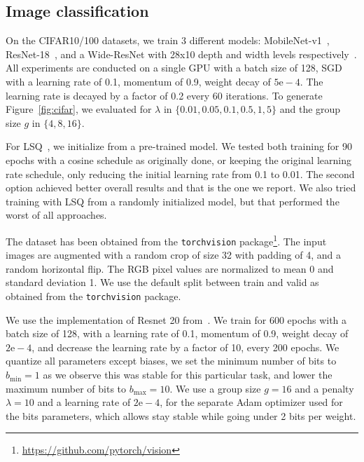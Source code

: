 \subsection{Image classification}
\label{supp:image}

On the CIFAR10/100 datasets, we train 3 different models: MobileNet-v1~\citep{howard2017mobilenets}, ResNet-18~\citep{he2016deep}, and a Wide-ResNet with 28x10 depth and width levels respectively~\citep{zagoruyko2016wide}.
All experiments are conducted on a single GPU with a batch size of 128, SGD with a learning rate of 0.1, momentum of 0.9,
weight decay of $5\mathrm{e}{-}4$. The learning rate is decayed by a factor of 0.2 every 60 iterations.
To generate Figure~\ref{fig:cifar}, we evaluated \diffq for $\lambda$ in $\{0.01, 0.05, 0.1, 0.5, 1, 5\}$
and the group size $g$ in $\{4, 8, 16\}$.

For LSQ~\citep{esser2020learned}, we initialize from a pre-trained model. We tested both training for 90 epochs with a cosine schedule as originally done, or keeping the original learning rate schedule, only reducing the initial learning rate from 0.1 to 0.01. The second option achieved better overall results and that is the one we report.
We also tried training with LSQ from a randomly initialized model, but that performed the worst of all approaches.

The dataset has been obtained from the \texttt{torchvision} package\footnote{\url{https://github.com/pytorch/vision}}.
The input images are augmented with a random crop of size 32 with padding of 4, and a random horizontal flip.
The RGB pixel values are normalized to mean 0 and standard deviation 1. We use the default split between
train and valid as obtained from the \texttt{torchvision} package.

We use the implementation of Resnet 20 from~\citet{Idelbayev18a}.
We train for 600 epochs with a batch size of 128, with a learning rate of 0.1, momentum of 0.9, weight decay of $2\mathrm{e}{-}4$, and decrease the learning rate by a factor of 10, every 200 epochs.
We quantize all parameters except biases, we set the minimum number of bits to $b_{\mathrm{min}} = 1$ as we observe this was stable for this particular task, and lower the maximum number of bits to $b_{\mathrm{max}} = 10$. We use a group size $g=16$ and a penalty $\lambda = 10$ and a learning rate of $2\mathrm{e}{-}4$, for the separate Adam optimizer used for the bits parameters, which allows stay stable while going under 2 bits per weight.

